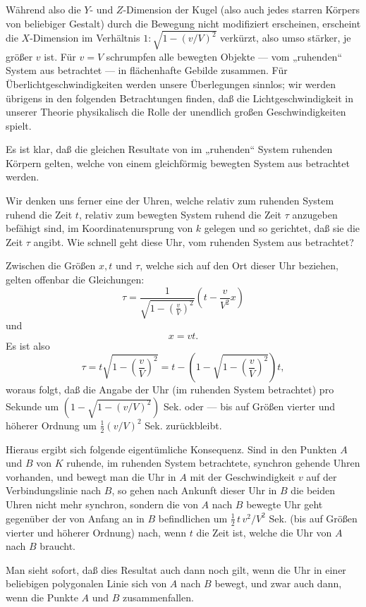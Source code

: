 \documentclass[17pt]{webarticle}       %
\begin{document}
Während also die \( Y \)- und \( Z \)-Dimension der Kugel (also auch jedes starren Körpers von beliebiger Gestalt) durch die Bewegung nicht modifiziert erscheinen, erscheint die \( X \)-Dimension im Verhältnis \( 1 : \sqrt{1 - (v/V)^2} \) verkürzt, also umso stärker, je größer \( v \) ist. Für \( v = V \) schrumpfen alle bewegten Objekte — vom „ruhenden“ System aus betrachtet — in flächenhafte Gebilde zusammen. Für Überlichtgeschwindigkeiten werden unsere Überlegungen sinnlos; wir werden übrigens in den folgenden Betrachtungen finden, daß die Lichtgeschwindigkeit in unserer Theorie physikalisch die Rolle der unendlich großen Geschwindigkeiten spielt.

Es ist klar, daß die gleichen Resultate von im „ruhenden“ System ruhenden Körpern gelten, welche von einem gleichförmig bewegten System aus betrachtet werden.

Wir denken uns ferner eine der Uhren, welche relativ zum ruhenden System ruhend die Zeit \( t \), relativ zum bewegten System ruhend die Zeit \( \tau \) anzugeben befähigt sind, im Koordinatenursprung von \( k \) gelegen und so gerichtet, daß sie die Zeit \( \tau \) angibt. Wie schnell geht diese Uhr, vom ruhenden System aus betrachtet?

Zwischen die Größen \( x, t \) und \( \tau \), welche sich auf den Ort dieser Uhr beziehen, gelten offenbar die Gleichungen:
\[
\tau = \frac{1}{\sqrt{1 - \left( \frac{v}{V} \right)^2}} \left( t - \frac{v}{V^2} x \right)
\]
und
\[
x = vt.
\]
Es ist also
\[
\tau = t \sqrt{1 - \left( \frac{v}{V} \right)^2} = t - \left( 1 - \sqrt{1 - \left( \frac{v}{V} \right)^2} \right) t,
\]
woraus folgt, daß die Angabe der Uhr (im ruhenden System betrachtet) pro Sekunde um \( (1 - \sqrt{1 - (v/V)^2}) \) Sek. oder — bis auf Größen vierter und höherer Ordnung um \(\frac{1}{2} (v/V)^2 \) Sek. zurückbleibt.

Hieraus ergibt sich folgende eigentümliche Konsequenz. Sind in den Punkten \( A \) und \( B \) von \( K \) ruhende, im ruhenden System betrachtete, synchron gehende Uhren vorhanden, und bewegt man die Uhr in \( A \) mit der Geschwindigkeit \( v \) auf der Verbindungslinie nach \( B \), so gehen nach Ankunft dieser Uhr in \( B \) die beiden Uhren nicht mehr synchron, sondern die von \( A \) nach \( B \) bewegte Uhr geht gegenüber der von Anfang an in \( B \) befindlichen um \( \frac{1}{2} \, t \, v^2/V^2 \) Sek. (bis auf Größen vierter und höherer Ordnung) nach, wenn \( t \) die Zeit ist, welche die Uhr von \( A \) nach \( B \) braucht.

Man sieht sofort, daß dies Resultat auch dann noch gilt, wenn die Uhr in einer beliebigen polygonalen Linie sich von \( A \) nach \( B \) bewegt, und zwar auch dann, wenn die Punkte \( A \) und \( B \) zusammenfallen.
\end{document}
